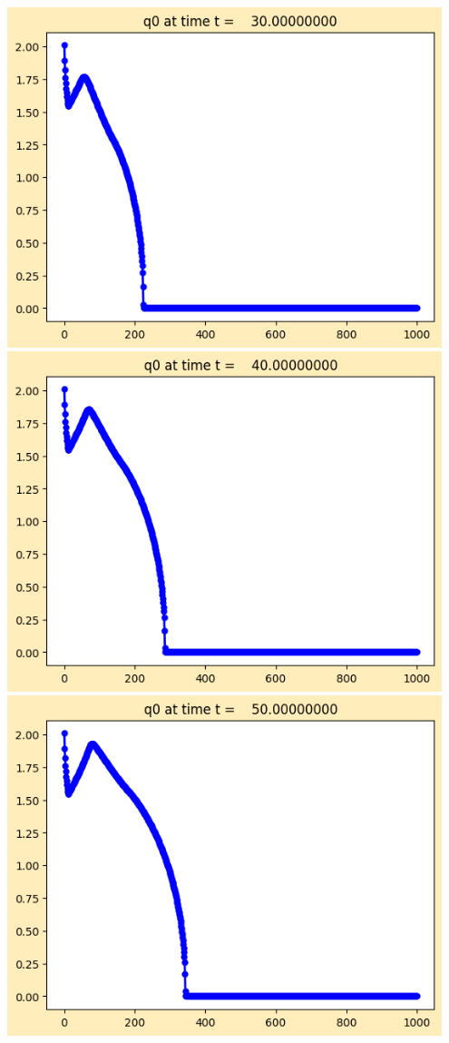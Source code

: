 \documentclass[11pt]{article}
\begin{document}
\vskip 10pt 
\includegraphics[width=0.95\textwidth]{frame0003fig1.png}
\vskip 10pt 
\includegraphics[width=0.95\textwidth]{frame0004fig1.png}
\vskip 10pt 
\includegraphics[width=0.95\textwidth]{frame0005fig1.png}
\end{document}
